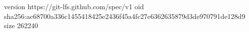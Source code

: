 version https://git-lfs.github.com/spec/v1
oid sha256:ac68700a336c1455418425e2436f45a4fc27e6362635879d3de970791de128d9
size 262240
